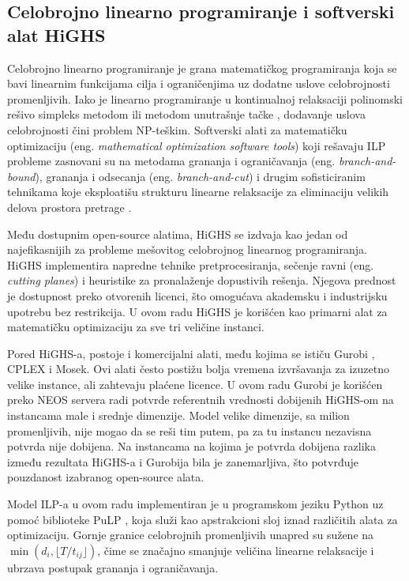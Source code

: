 \documentclass[12pt]{article}
\begin{document}
\subsection{Celobrojno linearno programiranje i softverski alat HiGHS}

Celobrojno linearno programiranje je grana matematičkog programiranja koja se bavi linearnim funkcijama cilja i ograničenjima uz dodatne uslove celobrojnosti promenljivih. Iako je linearno programiranje u kontinualnoj relaksaciji polinomski rešivo simpleks metodom ili metodom unutrašnje tačke \cite{OlcanPetrovicLP}, dodavanje uslova celobrojnosti čini problem NP-teškim. Softverski alati za matematičku optimizaciju (eng. \textit{mathematical optimization software tools}) koji rešavaju ILP probleme zasnovani su na metodama grananja i ograničavanja (eng. \textit{branch-and-bound}), grananja i odsecanja (eng. \textit{branch-and-cut}) i drugim sofisticiranim tehnikama koje eksploatišu strukturu linearne relaksacije za eliminaciju velikih delova prostora pretrage \cite{Wolsey2020}.

Među dostupnim open-source alatima, HiGHS \cite{HuangfuHall2018, HiGHS} se izdvaja kao jedan od najefikasnijih za probleme mešovitog celobrojnog linearnog programiranja. HiGHS implementira napredne tehnike pretprocesiranja, sečenje ravni (eng. \textit{cutting planes}) i heuristike za pronalaženje dopustivih rešenja. Njegova prednost je dostupnost preko otvorenih licenci, što omogućava akademsku i industrijsku upotrebu bez restrikcija. U ovom radu HiGHS je korišćen kao primarni alat za matematičku optimizaciju za sve tri veličine instanci.

Pored HiGHS-a, postoje i komercijalni alati, među kojima se ističu Gurobi \cite{Gurobi2024}, CPLEX i Mosek. Ovi alati često postižu bolja vremena izvršavanja za izuzetno velike instance, ali zahtevaju plaćene licence. U ovom radu Gurobi je korišćen preko NEOS servera radi potvrde referentnih vrednosti dobijenih HiGHS-om na instancama male i srednje dimenzije. Model velike dimenzije, sa milion promenljivih, nije mogao da se reši tim putem, pa za tu instancu nezavisna potvrda nije dobijena. Na instancama na kojima je potvrda dobijena razlika između rezultata HiGHS-a i Gurobija bila je zanemarljiva, što potvrđuje pouzdanost izabranog open-source alata.

Model ILP-a u ovom radu implementiran je u programskom jeziku Python uz pomoć biblioteke PuLP \cite{PuLP2011}, koja služi kao apstrakcioni sloj iznad različitih alata za optimizaciju. Gornje granice celobrojnih promenljivih unapred su sužene na $\min(d_i, \lfloor T/t_{ij} \rfloor)$, čime se značajno smanjuje veličina linearne relaksacije i ubrzava postupak grananja i ograničavanja.
\end{document}
